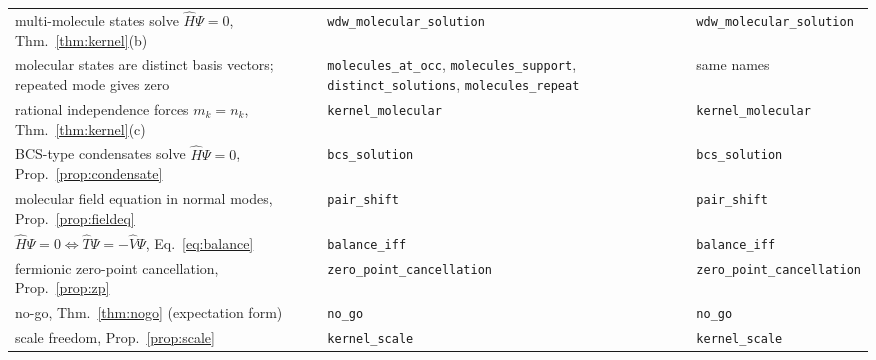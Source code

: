 \documentclass[reprint,aps,prd,amsmath,amssymb,superscriptaddress,nofootinbib,floatfix]{revtex4-2}
\theoremstyle{plain}
\theoremstyle{definition}
\theoremstyle{remark}
\newcommand{\Hc}{\hat{H}}
\newcommand{\Tc}{\hat{T}}
\newcommand{\Vc}{\hat{V}}
\begin{document}
\begin{table}[t]
\begin{ruledtabular}
\begin{tabular}{lll}
\parbox[t]{0.36\textwidth}{\raggedright multi-molecule states solve $\Hc\Psi=0$, Thm.~\ref{thm:kernel}(b)\strut} & \parbox[t]{0.30\textwidth}{\raggedright \texttt{wdw\_molecular\_solution}\strut} & \parbox[t]{0.30\textwidth}{\raggedright \texttt{wdw\_molecular\_solution}\strut} \\
\parbox[t]{0.36\textwidth}{\raggedright molecular states are distinct basis vectors; repeated mode gives zero\strut} & \parbox[t]{0.30\textwidth}{\raggedright \texttt{molecules\_at\_occ}, \texttt{molecules\_support}, \texttt{distinct\_solutions}, \texttt{molecules\_repeat}\strut} & \parbox[t]{0.30\textwidth}{\raggedright same names\strut} \\
\parbox[t]{0.36\textwidth}{\raggedright rational independence forces $m_k=n_k$, Thm.~\ref{thm:kernel}(c)\strut} & \parbox[t]{0.30\textwidth}{\raggedright \texttt{kernel\_molecular}\strut} & \parbox[t]{0.30\textwidth}{\raggedright \texttt{kernel\_molecular}\strut} \\
\parbox[t]{0.36\textwidth}{\raggedright BCS-type condensates solve $\Hc\Psi=0$, Prop.~\ref{prop:condensate}\strut} & \parbox[t]{0.30\textwidth}{\raggedright \texttt{bcs\_solution}\strut} & \parbox[t]{0.30\textwidth}{\raggedright \texttt{bcs\_solution}\strut} \\
\parbox[t]{0.36\textwidth}{\raggedright molecular field equation in normal modes, Prop.~\ref{prop:fieldeq}\strut} & \parbox[t]{0.30\textwidth}{\raggedright \texttt{pair\_shift}\strut} & \parbox[t]{0.30\textwidth}{\raggedright \texttt{pair\_shift}\strut} \\
\parbox[t]{0.36\textwidth}{\raggedright $\Hc\Psi=0\Leftrightarrow\Tc\Psi=-\Vc\Psi$, Eq.~\eqref{eq:balance}\strut} & \parbox[t]{0.30\textwidth}{\raggedright \texttt{balance\_iff}\strut} & \parbox[t]{0.30\textwidth}{\raggedright \texttt{balance\_iff}\strut} \\
\parbox[t]{0.36\textwidth}{\raggedright fermionic zero-point cancellation, Prop.~\ref{prop:zp}\strut} & \parbox[t]{0.30\textwidth}{\raggedright \texttt{zero\_point\_cancellation}\strut} & \parbox[t]{0.30\textwidth}{\raggedright \texttt{zero\_point\_cancellation}\strut} \\
\parbox[t]{0.36\textwidth}{\raggedright no-go, Thm.~\ref{thm:nogo} (expectation form)\strut} & \parbox[t]{0.30\textwidth}{\raggedright \texttt{no\_go}\strut} & \parbox[t]{0.30\textwidth}{\raggedright \texttt{no\_go}\strut} \\
\parbox[t]{0.36\textwidth}{\raggedright scale freedom, Prop.~\ref{prop:scale}\strut} & \parbox[t]{0.30\textwidth}{\raggedright \texttt{kernel\_scale}\strut} & \parbox[t]{0.30\textwidth}{\raggedright \texttt{kernel\_scale}\strut} \\

\end{tabular}
\end{ruledtabular}
\end{table}
\end{document}
